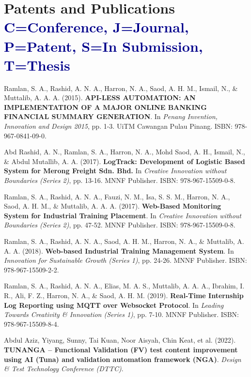 \section{\textbf{Patents and Publications} \hfill \textcolor{darkblue}{\scriptsize C=Conference, J=Journal, P=Patent, S=In Submission, T=Thesis}}
\vspace{0.2mm}
\small{
\begin{enumerate}[leftmargin=*, labelsep=0.5em, align=left, widest={[\textbf{C.4}]}, itemindent=0em, label={\textbf{[C.\arabic*]}}]
\item Ramlan, S. A., Rashid, A. N. A., Harron, N. A., Saod, A. H. M., Ismail, N., \& Muttalib, A. A. A. (2015). \textbf{API-LESS AUTOMATION: AN IMPLEMENTATION OF A MAJOR ONLINE BANKING FINANCIAL SUMMARY GENERATION}. In \textit{Penang Invention, Innovation and Design 2015}, pp. 1-3. UiTM Cawangan Pulau Pinang. ISBN: 978-967-0841-09-0.

\item Abd Rashid, A. N., Ramlan, S. A., Harron, N. A., Mohd Saod, A. H., Ismail, N., \& Abdul Mutallib, A. A. (2017). \textbf{LogTrack: Development of Logistic Based System for Merong Freight Sdn. Bhd.} In \textit{Creative Innovation without Boundaries (Series 2)}, pp. 13-16. MNNF Publisher. ISBN: 978-967-15509-0-8.

\item Ramlan, S. A., Rashid, A. N. A., Fauzi, N. M., Isa, S. S. M., Harron, N. A., Saod, A. H. M., \& Muttalib, A. A. A. (2017). \textbf{Web-Based Monitoring System for Industrial Training Placement}. In \textit{Creative Innovation without Boundaries (Series 2)}, pp. 47-52. MNNF Publisher. ISBN: 978-967-15509-0-8.

\item Ramlan, S. A., Rashid, A. N. A., Saod, A. H. M., Harron, N. A., \& Muttalib, A. A. A. (2018). \textbf{Web-based Industrial Training Management System}. In \textit{Innovation for Sustainable Growth (Series 1)}, pp. 24-26. MNNF Publisher. ISBN: 978-967-15509-2-2.

\item Ramlan, S. A., Rashid, A. N. A., Elias, M. A. S., Muttalib, A. A. A., Ibrahim, I. R., Ali, F. Z., Harron, N. A., \& Saod, A. H. M. (2019). \textbf{Real-Time Internship Log Reporting using MQTT over Websocket Protocol}. In \textit{Leading Towards Creativity \& Innovation (Series 1)}, pp. 7-10. MNNF Publisher. ISBN: 978-967-15509-8-4.

\item Abdul Aziz, Yiyang, Sunny, Tai Kuan, Noor Aisyah, Chin Keat, et al. (2022). \textbf{TUNANGA – Functional Validation (FV) test content improvement using AI (Tuna) and validation automation framework (NGA)}. \textit{Design \& Test Technology Conference (DTTC)}.
\end{enumerate}
}
